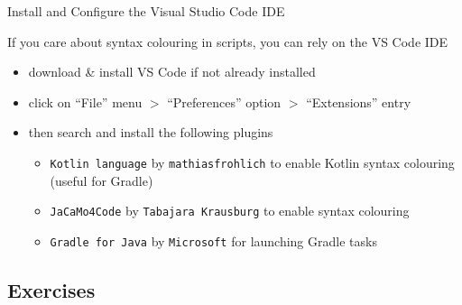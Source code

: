 \documentclass[presentation]{beamer}\mode<presentation>{\usetheme{AMSBolognaFC}}
\begin{document}
\begin{frame}[c]{Install and Configure the Visual Studio Code IDE}
    
    If you care about syntax colouring in \jason{} scripts, you can rely on the VS Code IDE
    \vfill
    \begin{itemize}
        \item download \& install VS Code if not already installed
        \begin{center}
        \end{center}
        
        \vfill
        
        \item click on \alert{``File'' menu $>$ ``Preferences'' option $>$ ``Extensions'' entry}
        
        \vfill
        
        \item then search and install the following plugins
        \begin{itemize}
            \item \alert{\texttt{Kotlin language}} by \texttt{mathiasfrohlich} to enable Kotlin syntax colouring (useful for Gradle) 
            \item \alert{\texttt{JaCaMo4Code}} by \texttt{Tabajara Krausburg} to enable \jason{} syntax colouring
            \item \alert{\texttt{Gradle for Java}} by \texttt{Microsoft} for launching Gradle tasks
        \end{itemize}
    \end{itemize}
    
\end{frame}

\subsection{\jason{} Exercises}
\end{document}
